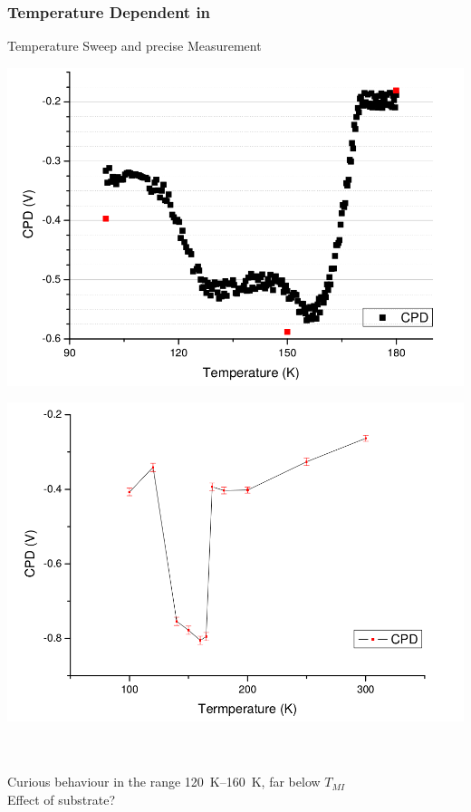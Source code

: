 \documentclass{beamer}
\begin{document}
\begin{frame}
\frametitle{Temperature Dependent \cpd{} in \wvadiox{}}
\begin{block}{Temperature Sweep and precise Measurement}
\centering
\begin{minipage}{0.45\linewidth}
\centering
	\includegraphics[width=1\linewidth]{./figs/pres/vox1pres}
\end{minipage}
\hfill
\begin{minipage}{0.45\linewidth}
\centering
	\includegraphics[width=1\linewidth]{./figs/pres/vox2pres}
\end{minipage}\\[5pt]\hrulefill\\
Curious behaviour in the range \SIrange{120}{160}{\kelvin}, far below $T_{MI}$ \\
Effect of substrate?
\end{block}\end{frame}
\end{document}
